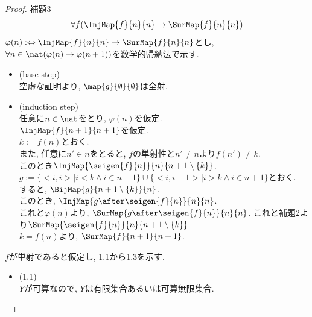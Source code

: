 \begin{proof}
  補題3
  \begin{equation}
   \forall f( \InjMap {f}{n}{n} \rightarrow \SurMap{f}{n}{n})
  \end{equation}
  $\varphi (n) :\Leftrightarrow \InjMap {f}{n}{n} \rightarrow \SurMap{f}{n}{n}$とし,
  $\forall n \in \nat (\varphi (n) \rightarrow \varphi (n+1))$を数学的帰納法で示す.\\
  \begin{itemize}
  \item[]\hspace{-0.5cm} (base step) \\
    空虚な証明より,
    $\map{g}{\emptyset}{\emptyset}$は全射.
  \item[]\hspace{-0.5cm} (induction step) \\
    任意に$n \in \nat$をとり,
    $\varphi (n)$を仮定.\\
    $\InjMap{f}{n+1}{n+1}$を仮定.\\
    $k := f(n)$とおく.\\
    また,
    任意に$n' \in n$をとると,
    $f$の単射性と$n' \neq n$より$f(n') \neq k$.\\
    このとき$\InjMap{\seigen{f}{n}}{n}{n+1 \setminus \{k\}}$.\\
    $g := \{<i, i> | i < k \land i \in n+1\} \cup \{<i, i - 1> | i > k \land i \in n+1\}$とおく.\\
    すると,
    $\BijMap{g}{n+1 \setminus \{k\}}{n}$.\\
    このとき,
    $\InjMap{g \after \seigen{f}{n}}{n}{n}$.\\ 
    これと$\varphi(n)$より,
    $\SurMap{g \after \seigen{f}{n}}{n}{n}$.
    これと補題2より$\SurMap{\seigen{f}{n}}{n}{n+1 \setminus \{k\}}$\\ 
    $k = f(n)$より,
    $\SurMap{f}{n+1}{n+1}$.
  \end{itemize}
  
  $f$が単射であると仮定し,
  1.1から1.3を示す.\\
  \begin{itemize}
    \item[]\hspace{-0.5cm} (1.1) \\
      $Y$が可算なので,
      $Y$は有限集合あるいは可算無限集合.\\
      

\end{itemize}
\end{proof}
